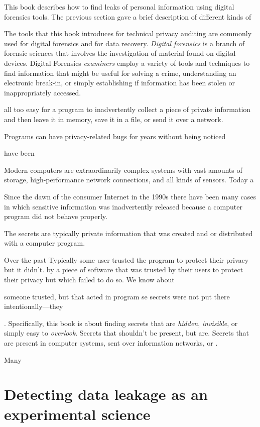 This book describes how to find leaks of personal information using
digital forensics tools. The previous section gave a brief description
of different kinds of 


The tools that this book introduces for technical privacy auditing are
commonly used for digital forensics and for data
  recovery. \emph{Digital forensics} is a branch of forensic sciences
  that involves the investigation of material found on digital
  devices. Digital Forensics \emph{examiners} employ a variety of
  tools and techniques to find information that might be useful for
  solving a crime, understanding an electronic break-in, or simply
  establishing if information has been stolen or inappropriately
  accessed. 


all too easy for a program to inadvertently collect a piece of private
information and then leave it in memory, save it in a file, or send it
over a network. 

Programs can have privacy-related bugs for years without being noticed 

have been 

Modern computers are extraordinarily complex systems with vast amounts
of storage, high-performance network connections, and all kinds of
sensors. Today a 

Since the dawn of the consumer Internet in the 1990s there have been
many cases in which sensitive information was inadvertently released
because a computer program did not behave properly. 

The secrets are typically
private information that was created and or distributed with a
computer program. 


Over the past 
Typically some user trusted the program to protect
their privacy but it didn't. by a piece
of software that was trusted by their users to protect their privacy
but which failed to do so. We know about 

someone trusted, but that acted in program se secrets were not put
there intentionally---they 

. Specifically, this book is about
finding secrets that are \emph{hidden}, \emph{invisible}, or simply
easy to \emph{overlook}. Secrets that shouldn't be present, but
are. Secrets that are present in computer systems, sent over
information networks, or .

Many 

\section{Detecting data leakage as an experimental science}
